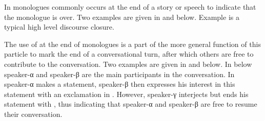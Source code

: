 In monologues  commonly occurs at the end
of a story or speech to indicate that the monologue is over.
Two examples are given in  and  below.
Example  is a typical high level discourse closure.

\begin{exe}
		\label{ex:130825-3, 2.35}
	\label{ex:120715-2, 1.31}
\end{exe}

The use of  at the end of monologues
is a part of the more general function of this
particle to mark the end of a conversational turn,
after which others are free to contribute to the conversation.
Two examples are given in 
and  below.
In  below speaker-α and speaker-β
are the main participants in the conversation.
In  speaker-α makes a statement,
speaker-β then expresses his interest in this statement with an exclamation in .
However, speaker-γ interjects but ends his statement with ,
thus indicating that speaker-α and speaker-β are free to resume their conversation.

